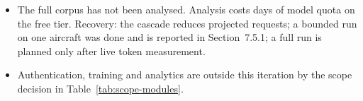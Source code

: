 

\begin{itemize}
\item The full corpus has not been analysed. Analysis costs days of model quota on the free tier. Recovery: the cascade reduces projected requests; a bounded run on one aircraft was done and is reported in Section~7.5.1; a full run is planned only after live token measurement.
\item Authentication, training and analytics are outside this iteration by the scope decision in Table~\ref{tab:scope-modules}.
\end{itemize}
